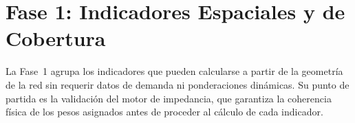 %
%
\section{Fase 1: Indicadores Espaciales y de Cobertura}
\label{sec:fase1-indicadores}

La Fase~1 agrupa los indicadores que pueden calcularse a partir de la geometría
de la red sin requerir datos de demanda ni ponderaciones dinámicas. Su punto de
partida es la validación del motor de impedancia, que garantiza la coherencia
física de los pesos asignados antes de proceder al cálculo de cada indicador.





